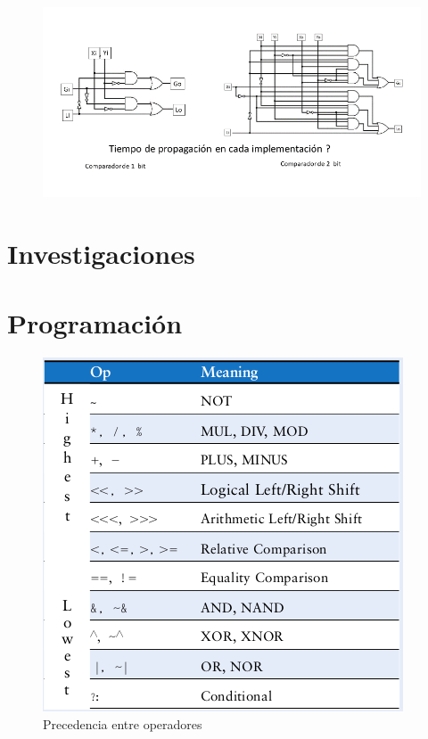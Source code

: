 \documentclass[12pt,letterpaper]{book}
\begin{document}
\begin{figure}[H]
\centering
\includegraphics[width=1\linewidth]{figures/tiePro3.png}
\caption{}
\label{tiePro3}
\end{figure}
\vspace{0.2cm}


\chapter{Investigaciones}


\chapter{Programación}

\begin{figure}[H] 
\centering
\includegraphics[width=1\linewidth]{figures/a1.png}
\caption{Precedencia entre operadores\cite[Pág . ?]{Harris}}
\label{a1}
\end{figure}
\vspace{0.2cm}
\end{document}

